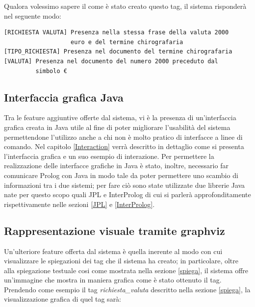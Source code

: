 Qualora volessimo sapere il come è stato creato questo tag, il sistema risponderà nel seguente modo:

\begin{verbatim}
[RICHIESTA VALUTA] Presenza nella stessa frase della valuta 2000
                   euro e del termine chirografaria
[TIPO_RICHIESTA] Presenza nel documento del termine chirografaria
[VALUTA] Presenza nel documento del numero 2000 preceduto dal 
         simbolo €
\end{verbatim}
\subsection{Interfaccia grafica Java}
Tra le feature aggiuntive offerte dal sistema, vi è la presenza di un'interfaccia grafica creata in Java utile al fine di poter migliorare l'usabilità del sistema permettendone l'utilizzo anche a chi non è molto pratico di interfacce a linee di comando. Nel capitolo \ref{Interaction} verrà descritto in dettaglio come si presenta l'interfaccia grafica e un suo esempio di interazione. 
Per permettere la realizzazione delle interfacce grafiche in Java è stato, inoltre, necessario far comunicare Prolog con Java in modo tale da poter permettere uno scambio di informazioni tra i due sistemi; per fare ciò sono state utilizzate due librerie Java nate per questo scopo quali JPL e InterProlog di cui si parlerà approfonditamente rispettivamente nelle sezioni \ref{JPL} e \ref{InterProlog}.
\subsection{Rappresentazione visuale tramite graphviz}
\nocite{gansner2006drawing}
\nocite{wiki:Graphviz}
Un'ulteriore feature offerta dal sistema è quella inerente al modo con cui visualizzare le spiegazioni dei tag che il sistema ha creato; in particolare, oltre alla spiegazione testuale cosi come mostrata nella sezione \ref{spiega}, il sistema offre un'immagine che mostra in maniera grafica come è stato ottenuto il tag.
Prendendo come esempio il tag \emph{richiesta\_valuta} descritto nella sezione \ref{spiega}, la visualizzazione grafica di quel tag sarà:

